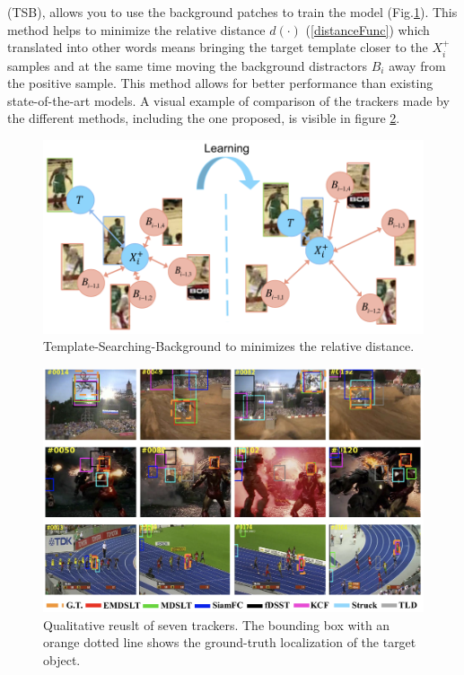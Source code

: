 \begin{enumerate}
    (TSB), allows you to use the background patches to train the model 
    (Fig.\ref{fig:TSBMin}). This method helps to minimize the relative distance $d(\cdot)$ (\ref{distanceFunc}) 
    which translated into other words means bringing the target template 
    closer to the $X_i^+$ samples and at the same time moving the background 
    distractors $B_i$ away from the positive sample. This method allows for 
    better performance than existing state-of-the-art models. A visual example 
    of comparison of the trackers made by the different methods, 
    including the one proposed, is visible in figure \ref{fig:qualitativeTracking}.
    \begin{figure}[h!]
        \centering
        \includegraphics[width = \linewidth]{images/paper8/TSB.png}
        \centering
        \caption{Template-Searching-Background to minimizes the relative distance.}
        \label{fig:TSBMin}
    \end{figure}
    \begin{figure}[h!]
        \centering
        \includegraphics[width = \linewidth]{images/paper8/qualitative.png}
        \centering
        \caption{Qualitative reuslt of seven trackers. The bounding box with an orange dotted line shows the ground-truth localization of the target object.}
        \label{fig:qualitativeTracking}
    \end{figure}
\end{enumerate}


